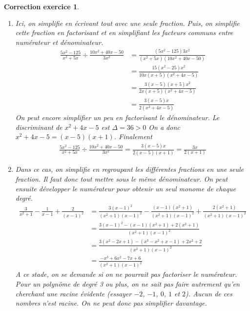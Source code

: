 \documentclass[12pt]{article}
\newtheorem{correction}{\bf Correction exercice}
\newenvironment{cor}{
\begin{correction}\smallskip\normalfont}{\end{correction}
}
\begin{document}
\begin{cor}
\begin{enumerate}
\item Ici, on simplifie en \'ecrivant tout avec une seule fraction.
  Puis, on simplifie cette fraction en factorisant et en simplifiant les facteurs communs
  entre num\'erateur et d\'enominateur.
  \begin{align*}
    \frac{5x^2 - 125}{x^2 + 5x} \div \frac{10x^2 + 40x - 50}{3x^2}
    &= \frac{(5x^2 - 125)3x^2}{(x^2 + 5x)(10x^2 + 40x - 50)}
    \\
    &= \frac{15(x^2 - 25)x^2}{10x(x + 5)(x^2 + 4x - 5)}
    \\
    &= \frac{3(x-5)(x+5)x^2}{2x(x + 5)(x^2 + 4x - 5)}
    \\
    &= \frac{3(x-5)x}{2(x^2 + 4x - 5)}
  \end{align*}
  On peut encore simplifier un peu en factorisant le d\'enominateur.
  Le discriminant de $x^2 + 4x - 5$ est $\Delta = 36 > 0$
  On a donc $x^2 + 4x - 5 = (x-5)(x+1)$.
  Finalement
  \begin{align*}
    \frac{5x^2 - 125}{x^2 + 5x} \div \frac{10x^2 + 40x - 50}{3x^2}
    = \frac{3(x-5)x}{2(x-5)(x+1)}
    = \frac{3x}{2(x+1)}
  \end{align*}
  
\item Dans ce cas, on simplifie en regroupant les diff\'erentes fractions en une seule fraction.
  Il faut donc tout mettre sous le m\^eme d\'enominateur.
  On peut ensuite d\'evelopper le num\'erateur pour obtenir un seul monome de chaque degr\'e.
  \begin{align*}
    \frac{3}{x^2+1} - \frac{1}{x-1} + \frac{2}{(x-1)^2}
    &= \frac{3(x-1)^2}{(x^2+1)(x-1)^2} - \frac{(x-1)(x^2+1)}{(x^2+1)(x-1)^2}
      + \frac{2 (x^2+1)}{(x^2+1)(x-1)^2}
    \\
    &= \frac{3(x-1)^2 - (x-1)(x^2+1) + 2 (x^2 + 1 ) }{(x^2+1)(x-1)^2}
    \\
    &= \frac{3(x^2-2x+1) - (x^3-x^2+x-1) + 2 x^2 + 2}{(x^2+1)(x-1)^2}
    \\
    &= \frac{-x^3 + 6 x^2 - 7 x + 6}{(x^2+1)(x-1)^2}
  \end{align*}
  A ce stade, on se demande si on ne pourrait pas factoriser le num\'erateur.
  Pour un polyn\^ome de degr\'e 3 ou plus, on ne sait pas faire autrement qu'en cherchant
  une racine \'evidente (essayer $-2$, $-1$, $0$, $1$ et $2$).
  Aucun de ces nombres n'est racine. On ne peut donc pas simplifier davantage.


\end{enumerate}
\end{cor}
\end{document}
